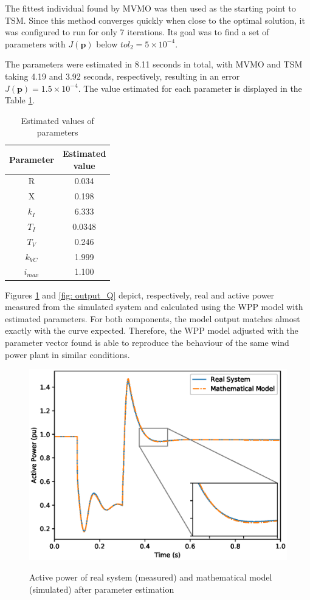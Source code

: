 The fittest individual found by MVMO was then used as the starting point to TSM. Since this method converges quickly when close to the optimal solution, it was configured to run for only 7 iterations. Its goal was to find a set of parameters with $J(\mathbf{p})$ below $tol_{2} = 5\times10^{-4}$.

The parameters were estimated in 8.11 seconds in total, with MVMO and TSM taking 4.19 and 3.92 seconds, respectively, resulting in an error $J(\mathbf{p}) = 1.5\times 10^{-4}$. The value estimated for each parameter is displayed in the Table \ref{tab: results}.

\begin{table}[h]
	\centering
	\caption{Estimated values of parameters}
	\begin{tabular}{c|c}
		Parameter & \shortstack{Estimated \\ value} \\\hline
		R & 0.034 \\
		X & 0.198 \\
		$k_{I}$ & 6.333 \\
		$T_{I}$ & 0.0348 \\
		$T_{V}$ & 0.246 \\
		$k_{VC}$ & 1.999 \\
		$i_{max}$ & 1.100
	\end{tabular}
	\label{tab: results}
\end{table}

Figures \ref{fig: output_P} and \ref{fig: output_Q} depict, respectively, real and active power measured from the simulated system and calculated using the WPP model with estimated parameters. For both components, the model output matches almost exactly with the curve expected. Therefore, the WPP model adjusted with the parameter vector found is able to reproduce the behaviour of the same wind power plant in similar conditions.

\begin{figure}[h]
	\centering
	\caption{Active power of real system (measured) and mathematical model (simulated) after parameter estimation}
	\includegraphics[scale=0.7]{Images/P_compared.eps}
	\label{fig: output_P}
\end{figure}

